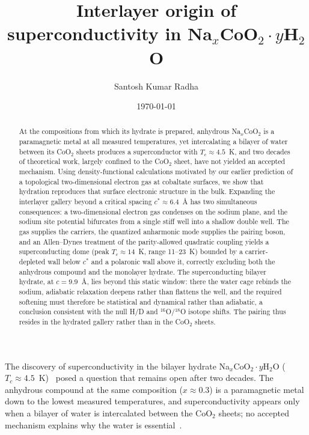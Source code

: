 \documentclass[aps,prl,twocolumn,superscriptaddress,floatfix]{revtex4-2}
\begin{document}
\title{Interlayer origin of superconductivity in Na$_x$CoO$_2\cdot y$H$_2$O}

\author{Santosh Kumar Radha}


\date{\today}

\begin{abstract}
At the compositions from which its hydrate is prepared, anhydrous Na$_x$CoO$_2$ is a paramagnetic
metal at all measured temperatures, yet intercalating a bilayer of water between its CoO$_2$
sheets produces a superconductor with $T_c\approx4.5$~K, and two decades of theoretical work,
largely confined to the CoO$_2$ sheet, have not yielded an accepted mechanism. Using density-functional calculations motivated by our earlier prediction of a
topological two-dimensional electron gas at cobaltate surfaces, we show that hydration reproduces
that surface electronic structure in the bulk. Expanding the interlayer gallery beyond a critical
spacing $c^\ast\approx6.4$~\AA{} has two simultaneous consequences: a two-dimensional electron gas
condenses on the sodium plane, and the sodium site potential bifurcates from a single stiff well
into a shallow double well. The gas supplies the carriers, the quantized anharmonic mode supplies the
pairing boson, and an Allen--Dynes treatment of the parity-allowed quadratic coupling yields a
superconducting dome (peak $T_c\approx14$~K, range 11--23~K) bounded by a carrier-depleted wall
below $c^\ast$ and a polaronic wall above it, correctly excluding both the anhydrous compound and
the monolayer hydrate. The superconducting bilayer hydrate, at $c=9.9$~\AA, lies beyond this
static window: there the water cage rebinds the sodium, adiabatic relaxation deepens rather than
flattens the well, and the required softening must therefore be statistical and dynamical rather
than adiabatic, a conclusion consistent with the null H/D and $^{16}$O/$^{18}$O isotope shifts.
The pairing thus resides in the hydrated gallery rather than in the CoO$_2$ sheets.
\end{abstract}

\maketitle

The discovery of superconductivity in the bilayer hydrate Na$_x$CoO$_2\cdot y$H$_2$O
($T_c\approx4.5$~K)~\cite{Takada2003} posed a question that remains open after two decades. The
anhydrous compound at the same composition ($x\approx0.3$) is a paramagnetic metal down to the
lowest measured temperatures, and
superconductivity appears only when a bilayer of water is intercalated between the CoO$_2$ sheets;
no accepted mechanism explains why the water is essential~\cite{MazinJohannes2005}.
\end{document}
